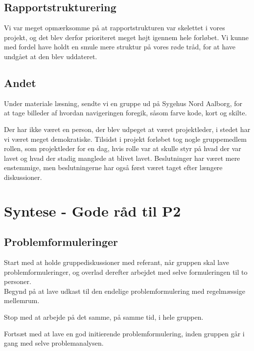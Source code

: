 \documentclass[a4paper,12pt,oneside,article]{memoir}
\begin{document}
        \subsection{Rapportstrukturering}

        Vi var meget opmærksomme på at rapportstrukturen var skelettet i vores projekt, og det blev derfor prioriteret meget højt igennem hele forløbet. Vi kunne med fordel have holdt en smule mere struktur på vores røde tråd, for at have undgået at den blev uddateret.


        \subsection{Andet}
        Under materiale læsning, sendte vi en gruppe ud på Sygehus Nord Aalborg, for at tage billeder af hvordan navigeringen foregik, såsom farve kode, kort og skilte.

        Der har ikke været en person, der blev udpeget at været projektleder, i stedet har vi været meget demokratiske. Tilsidst i projekt forløbet tog nogle gruppemedlem rollen, som projektleder for en dag, hvis rolle var at skulle styr på hvad der var lavet og hvad der stadig manglede at blivet lavet. Beslutninger har været mere enstemmige, men beslutningerne har også først været taget efter længere diskussioner.

    \section{Syntese - Gode råd til P2}

    

    \subsection{Problemformuleringer}

        Start med at holde gruppediskussioner med referant, når gruppen skal lave problemformuleringer, og overlad derefter arbejdet med selve formuleringen til to personer.\\
        Begynd på at lave udkast til den endelige problemformulering med regelmæssige mellemrum.

        Stop med at arbejde på det samme, på samme tid, i hele gruppen.

        Fortsæt med at lave en god initierende problemformulering, inden gruppen går i gang med selve problemanalysen.
\end{document}
